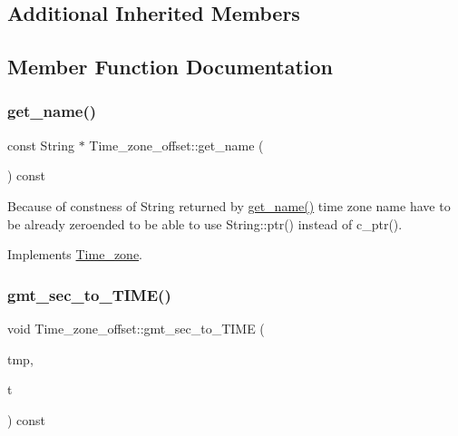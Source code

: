 \subsection*{Additional Inherited Members}


\subsection{Member Function Documentation}
\mbox{\label{classTime__zone__offset_a4d9694d180deaca9af20beb7e785d9dd}} 
\subsubsection{\texorpdfstring{get\+\_\+name()}{get\_name()}}
{\footnotesize\ttfamily const String $\ast$ Time\+\_\+zone\+\_\+offset\+::get\+\_\+name (\begin{DoxyParamCaption}{ }\end{DoxyParamCaption}) const\hspace{0.3cm}{\ttfamily [virtual]}}

Because of constness of String returned by \mbox{\hyperlink{classTime__zone__offset_a4d9694d180deaca9af20beb7e785d9dd}{get\+\_\+name()}} time zone name have to be already zeroended to be able to use String\+::ptr() instead of c\+\_\+ptr(). 

Implements \mbox{\hyperlink{classTime__zone_a8116436f7b8e19dc4b99cd78a786e47f}{Time\+\_\+zone}}.

\mbox{\label{classTime__zone__offset_ad6f8ec41d8d908cdc49e699fa16deff2}} 
\subsubsection{\texorpdfstring{gmt\+\_\+sec\+\_\+to\+\_\+\+T\+I\+M\+E()}{gmt\_sec\_to\_TIME()}}
{\footnotesize\ttfamily void Time\+\_\+zone\+\_\+offset\+::gmt\+\_\+sec\+\_\+to\+\_\+\+T\+I\+ME (\begin{DoxyParamCaption}\item[{M\+Y\+S\+Q\+L\+\_\+\+T\+I\+ME $\ast$}]{tmp,  }\item[{my\+\_\+time\+\_\+t}]{t }\end{DoxyParamCaption}) const\hspace{0.3cm}{\ttfamily [virtual]}}

